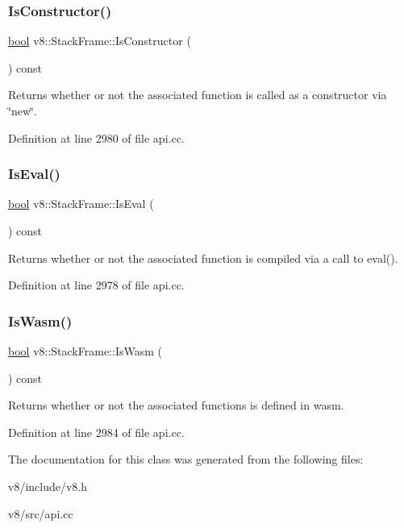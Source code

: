 \mbox{\label{classv8_1_1StackFrame_a8f37df38214b6dc10655fc50f0341eb8}} 
\subsubsection{\texorpdfstring{Is\+Constructor()}{IsConstructor()}}
{\footnotesize\ttfamily \mbox{\hyperlink{classbool}{bool}} v8\+::\+Stack\+Frame\+::\+Is\+Constructor (\begin{DoxyParamCaption}{ }\end{DoxyParamCaption}) const}

Returns whether or not the associated function is called as a constructor via \char`\"{}new\char`\"{}. 

Definition at line 2980 of file api.\+cc.

\mbox{\label{classv8_1_1StackFrame_aa07e67a6a00adcd0f5c8c4ba7a82e54a}} 
\subsubsection{\texorpdfstring{Is\+Eval()}{IsEval()}}
{\footnotesize\ttfamily \mbox{\hyperlink{classbool}{bool}} v8\+::\+Stack\+Frame\+::\+Is\+Eval (\begin{DoxyParamCaption}{ }\end{DoxyParamCaption}) const}

Returns whether or not the associated function is compiled via a call to eval(). 

Definition at line 2978 of file api.\+cc.

\mbox{\label{classv8_1_1StackFrame_aec6d28360828b8cadc3da6a5dbd83d89}} 
\subsubsection{\texorpdfstring{Is\+Wasm()}{IsWasm()}}
{\footnotesize\ttfamily \mbox{\hyperlink{classbool}{bool}} v8\+::\+Stack\+Frame\+::\+Is\+Wasm (\begin{DoxyParamCaption}{ }\end{DoxyParamCaption}) const}

Returns whether or not the associated functions is defined in wasm. 

Definition at line 2984 of file api.\+cc.



The documentation for this class was generated from the following files\+:\begin{DoxyCompactItemize}
\item 
v8/include/v8.\+h\item 
v8/src/api.\+cc\end{DoxyCompactItemize}
